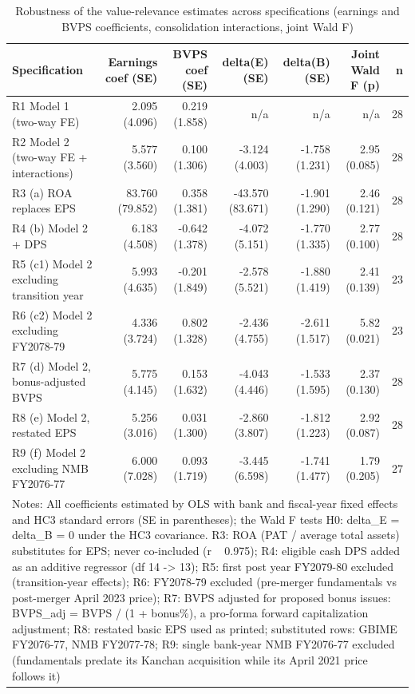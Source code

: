 \begin{table}[htbp]
\centering
\caption{Robustness of the value-relevance estimates across specifications (earnings and BVPS coefficients, consolidation interactions, joint Wald F)}
\label{tab:t5_robustness}
\begin{tabular}{lrrrrrr}
\toprule
Specification & Earnings coef (SE) & BVPS coef (SE) & delta(E) (SE) & delta(B) (SE) & Joint Wald F (p) & n \\
\midrule
R1 Model 1 (two-way FE) & 2.095 (4.096) & 0.219 (1.858) & n/a & n/a & n/a & 28 \\
R2 Model 2 (two-way FE + interactions) & 5.577 (3.560) & 0.100 (1.306) & -3.124 (4.003) & -1.758 (1.231) & 2.95 (0.085) & 28 \\
R3 (a) ROA replaces EPS & 83.760 (79.852) & 0.358 (1.381) & -43.570 (83.671) & -1.901 (1.290) & 2.46 (0.121) & 28 \\
R4 (b) Model 2 + DPS & 6.183 (4.508) & -0.642 (1.378) & -4.072 (5.151) & -1.770 (1.335) & 2.77 (0.100) & 28 \\
R5 (c1) Model 2 excluding transition year & 5.993 (4.635) & -0.201 (1.849) & -2.578 (5.521) & -1.880 (1.419) & 2.41 (0.139) & 23 \\
R6 (c2) Model 2 excluding FY2078-79 & 4.336 (3.724) & 0.802 (1.328) & -2.436 (4.755) & -2.611 (1.517) & 5.82 (0.021) & 23 \\
R7 (d) Model 2, bonus-adjusted BVPS & 5.775 (4.145) & 0.153 (1.632) & -4.043 (4.446) & -1.533 (1.595) & 2.37 (0.130) & 28 \\
R8 (e) Model 2, restated EPS & 5.256 (3.016) & 0.031 (1.300) & -2.860 (3.807) & -1.812 (1.223) & 2.92 (0.087) & 28 \\
R9 (f) Model 2 excluding NMB FY2076-77 & 6.000 (7.028) & 0.093 (1.719) & -3.445 (6.598) & -1.741 (1.477) & 1.79 (0.205) & 27 \\
\midrule
\multicolumn{7}{l}{\footnotesize Notes: All coefficients estimated by OLS with bank and fiscal-year fixed effects and HC3 standard errors (SE in parentheses); the Wald F tests H0: delta\_E = delta\_B = 0 under the HC3 covariance. R3: ROA (PAT / average total assets) substitutes for EPS; never co-included (r ~ 0.975); R4: eligible cash DPS added as an additive regressor (df 14 -> 13); R5: first post year FY2079-80 excluded (transition-year effects); R6: FY2078-79 excluded (pre-merger fundamentals vs post-merger April 2023 price); R7: BVPS adjusted for proposed bonus issues: BVPS\_adj = BVPS / (1 + bonus\%), a pro-forma forward capitalization adjustment; R8: restated basic EPS used as printed; substituted rows: GBIME FY2076-77, NMB FY2077-78; R9: single bank-year NMB FY2076-77 excluded (fundamentals predate its Kanchan acquisition while its April 2021 price follows it)} \\
\bottomrule
\end{tabular}
\end{table}
